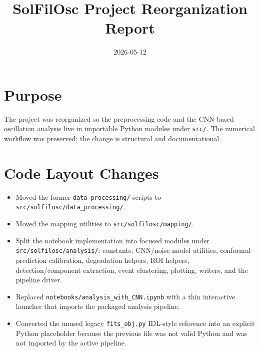 \documentclass{article}
\title{SolFilOsc Project Reorganization Report}
\date{2026-05-12}
\begin{document}
\maketitle

\section{Purpose}
The project was reorganized so the preprocessing code and the CNN-based
oscillation analysis live in importable Python modules under \texttt{src/}.
The numerical workflow was preserved; the change is structural and
documentational.

\section{Code Layout Changes}
\begin{itemize}[leftmargin=*]
  \item Moved the former \texttt{data\_processing/} scripts to
  \texttt{src/solfilosc/data\_processing/}.
  \item Moved the mapping utilities to \texttt{src/solfilosc/mapping/}.
  \item Split the notebook implementation into focused modules under
  \texttt{src/solfilosc/analysis/}: constants, CNN/noise-model utilities,
  conformal-prediction calibration, degradation helpers, ROI helpers,
  detection/component extraction, event clustering, plotting, writers, and
  the pipeline driver.
  \item Replaced \texttt{notebooks/analysis\_with\_CNN.ipynb} with a thin
  interactive launcher that imports the packaged analysis pipeline.
  \item Converted the unused legacy \texttt{fits\_obj.py} IDL-style reference
  into an explicit Python placeholder because the previous file was not valid
  Python and was not imported by the active pipeline.
\end{itemize}
\end{document}
